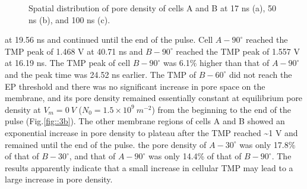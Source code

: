 \documentclass[conference]{IEEEtran}
\begin{document}
\begin{figure}[htbp]
	\centering
	\label{fig::5}
	\caption{Spatial distribution of pore density of cells A and B at 17 ns (a), 50 ns (b), and 100 ns (c).}
\end{figure} at 19.56 ns and continued until the end of the pulse. Cell $A-90^{\circ}$ reached the TMP peak of 1.468 V at 40.71 ns and $B-90^{\circ}$ reached the TMP peak of 1.557 V at 16.19 ns. The TMP peak of cell $B-90^{\circ}$ was 6.1$\%$ higher than that of $A-90^{\circ}$ and the peak time was 24.52 ns earlier. The TMP of $B-60^{\circ}$ did not reach the EP threshold and there was no significant increase in pore space on the membrane, and its pore density remained essentially constant at equilibrium pore density at $V_m=0~V$ ($N_0 =1.5\times10^9~m^{-2}$) from the beginning to the end of the pulse (Fig.\ref{fig::3b}). The other membrane regions of cells A and B showed an exponential increase in pore density to plateau after the TMP reached \textasciitilde1 V and remained until the end of the pulse. the pore density of $A-30^{\circ}$ was only 17.8\% of that of $B-30^{\circ}$, and that of $A-90^{\circ}$ was only 14.4\% of that of $B-90^{\circ}$. The results apparently indicate that a small increase in cellular TMP may lead to a large increase in pore density.
\end{document}
